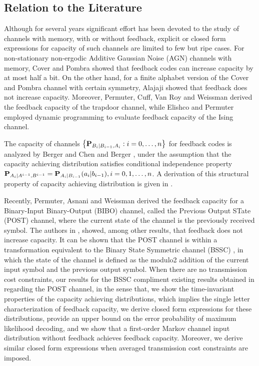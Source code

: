 \documentclass[11pt, a4paper, journal,onecolumn]{IEEEtran}
\begin{document}
\subsection{Relation to the Literature}  
\par Although for several years significant effort has been devoted to the study of channels with memory, with or without feedback, explicit or closed form expressions for  capacity of such channels  are limited to few but ripe cases. For   non-stationary  non-ergodic  Additive Gaussian Noise (AGN) channels  with memory, Cover and Pombra \cite{cover-pombra1989} showed that feedback codes can increase capacity  by at most half a bit. On the other hand, for a finite alphabet version of the Cover and Pombra channel with certain symmetry, Alajaji \cite{alajaji} showed that feedback does not increase capacity.  Moreover, Permuter, Cuff, Van Roy and Weissman \cite{permuter08} derived the feedback capacity of the trapdoor channel, while Elishco and Permuter  \cite{elishco} employed dynamic programming to evaluate  feedback capacity of the Ising channel.  
\par  The capacity of channels $\big\{{\bf P}_{B_i|B_{i-1}, A_i}: i=0, \ldots, n\big\}$ for  feedback codes is analyzed  by Berger \cite{berger_shannon_lecture} and  Chen and Berger \cite{chen-berger2005}, under the assumption  that the capacity achieving distribution satisfies conditional independence  property $
{\bf P}_{A_i|A^{i-1}, B^{i-1}}={\bf P}_{A_i|B_{i-1}}(a_i|b_{i-1}), i=0,1,\ldots,n$. A derivation of this structural property of capacity achieving distribution is given  in \cite{kourtellaris2015information, kourtellarisISIT2016}. 
\par Recently, Permuter,  Asnani and Weissman \cite{asnani13,asnani13j} derived the feedback capacity for a Binary-Input Binary-Output (BIBO) channel, called the Previous Output STate (POST) channel, where the current state of the channel is the previously received symbol.    The authors in \cite{asnani13j}, showed, among other results, that feedback does not increase capacity.  It can be shown that the POST channel  is within a transformation equivalent to  the Binary State Symmetric channel (BSSC) \cite{kourtellaris_itw2015}, in which the state of the channel is defined as the modulo2 addition of the current input symbol and the previous output symbol.  When there are no transmission cost constraints, our results for the BSSC compliment existing results obtained in \cite{asnani13,asnani13j} regarding the POST channel, in the sense that, we show the time-invariant properties of the capacity achieving distributions,  which implies the single letter characterization of feedback  capacity, we derive closed form expressions for these distributions,  provide an upper bound on the error probability of maximum likelihood decoding, and we show that a first-order Markov channel input distribution without feedback achieves feedback capacity. Moreover, we derive similar closed form expressions when averaged transmission cost constraints are imposed. 
\end{document}
